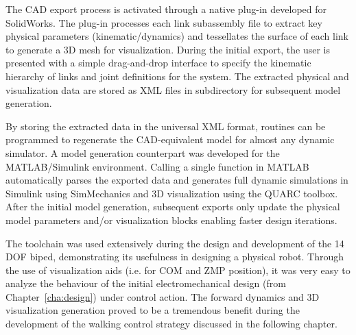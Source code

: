 The CAD export process is activated through a native plug-in developed for SolidWorks. The plug-in processes each link subassembly file to extract key physical parameters (kinematic/dynamics) and tessellates the surface of each link to generate a 3D mesh for visualization. During the initial export, the user is presented with a simple drag-and-drop interface to specify the kinematic hierarchy of links and joint definitions for the system. The extracted physical and visualization data are stored as XML files in subdirectory for subsequent model generation. 

By storing the extracted data in the universal XML format, routines can be programmed to regenerate the CAD-equivalent model for almost any dynamic simulator. A model generation counterpart was developed for the MATLAB/Simulink environment. Calling a single function in MATLAB automatically parses the exported data and generates full dynamic simulations in Simulink using SimMechanics and 3D visualization using the QUARC toolbox. After the initial model generation, subsequent exports only update the physical model parameters and/or visualization blocks enabling faster design iterations. 

The toolchain was used extensively during the design and development of the 14 DOF biped, demonstrating its usefulness in designing a physical robot. Through the use of visualization aids (i.e. for COM and ZMP position), it was very easy to analyze the behaviour of the initial electromechanical design (from Chapter~\ref{cha:design}) under control action. The forward dynamics and 3D visualization generation proved to be a tremendous benefit during the development of the walking control strategy discussed in the following chapter.

